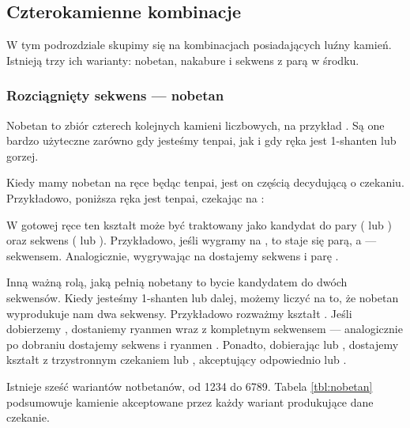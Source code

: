 \newpage
\subsection{Czterokamienne kombinacje}
W tym podrozdziale skupimy się na kombinacjach posiadających luźny kamień.
Istnieją trzy ich warianty: {\jap nobetan}, {\jap nakabure} i sekwens z parą w środku.

\subsubsection{Rozciągnięty sekwens --- {\jap nobetan}} \label{sec:nobetan}
{\jap Nobetan} to zbiór czterech kolejnych kamieni liczbowych, na przykład .
Są one bardzo użyteczne zarówno gdy jesteśmy {\jap tenpai}, jak i gdy ręka jest 1-{\jap shanten} lub gorzej.

\bigskip
Kiedy mamy {\jap nobetan} na ręce będąc {\jap tenpai}, jest on częścią decydującą o czekaniu.
Przykładowo, poniższa ręka jest {\jap tenpai}, czekając na :
\begin{screen}
\end{screen}
W gotowej ręce ten kształt może być traktowany jako kandydat do pary ( lub ) oraz sekwens ( lub ).
Przykładowo, jeśli wygramy na , to  staje się parą, a  --- sekwensem.
Analogicznie, wygrywając na  dostajemy sekwens  i parę .

\bigskip
Inną ważną rolą, jaką pełnią {\jap nobetan}y to bycie kandydatem do dwóch sekwensów.
Kiedy jesteśmy 1-{\jap shanten} lub dalej, możemy liczyć na to, że {\jap nobetan} wyprodukuje nam dwa sekwensy.
Przykładowo rozważmy kształt .
Jeśli dobierzemy , dostaniemy {\jap ryanmen}  wraz z kompletnym sekwensem  --- analogicznie po dobraniu  dostajemy sekwens  i {\jap ryanmen} .
Ponadto, dobierając  lub , dostajemy kształt z trzystronnym czekaniem  lub , akceptujący odpowiednio  lub .

\bigskip
Istnieje sześć wariantów {\jap notbetan}ów, od 1234 do 6789.
Tabela \ref{tbl:nobetan} podsumowuje kamienie akceptowane przez każdy wariant produkujące dane czekanie.


